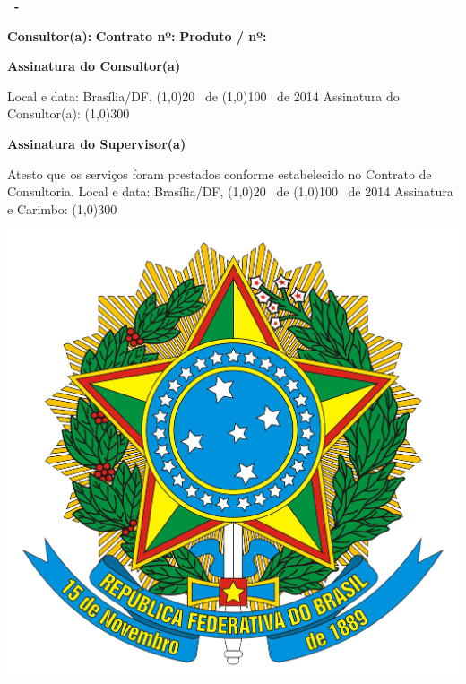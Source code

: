 \addtolength{\topmargin}{2.5cm}
\thispagestyle{empty}

{\bf \ProjectCode \ -} \ProductDescription

\vspace{2.5cm}

\begin{minipage}{\textwidth}
  {\bf Consultor(a): \MyName}
  \newline
  {\bf Contrato nº: \ContractNumber}
  \newline
  {\bf Produto / nº: \ProductNumber}
\end{minipage}

\vspace{2cm}

{\bf Assinatura do Consultor(a)}

\begin{framed}
\noindent Local e data: Brasília/DF, \line(1,0){20} \ de \line(1,0){100} \ de 2014
\newline
\newline
Assinatura do Consultor(a): \line(1,0){300}
\end{framed}

\vspace{1cm}

{\bf Assinatura do Supervisor(a)}

\begin{framed}
\noindent Atesto que os serviços foram prestados conforme estabelecido no
Contrato de Consultoria.
\newline
\newline
Local e data: Brasília/DF, \line(1,0){20} \ de \line(1,0){100} \ de 2014
\newline
\newline
Assinatura e Carimbo: \line(1,0){300}
\end{framed}

\vspace{1.5cm}

\begin{center}
\includegraphics[scale=0.04]{brasao.png} \\
{\bf \small \NomeSecretaria}
\end{center}

\restoregeometry
\newpage
